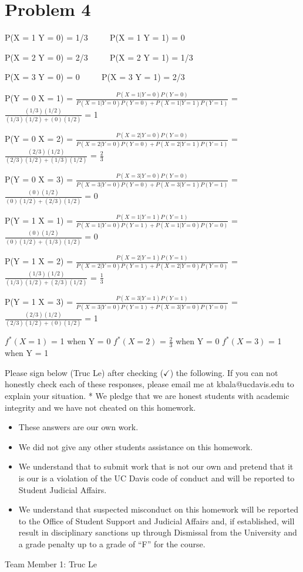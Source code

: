 \documentclass[11pt]{article}
\begin{document}
    \hypertarget{problem-4}{%
\section{Problem 4}\label{problem-4}}

    P(X = 1\textbar{} Y = 0) = 1/3    P(X = 1\textbar{} Y = 1) = 0

P(X = 2\textbar{} Y = 0) = 2/3    P(X = 2\textbar{} Y = 1) = 1/3

P(X = 3\textbar{} Y = 0) = 0    P(X = 3\textbar{} Y = 1) = 2/3

P(Y = 0\textbar{} X = 1) =
\(\frac{P(X = 1|Y = 0)P(Y = 0)}{P(X = 1|Y = 0)P(Y = 0) + P(X = 1|Y = 1)P(Y = 1)}\)
= \(\frac{(1/3)(1/2)}{(1/3)(1/2) + (0)(1/2)}\) = 1

P(Y = 0\textbar{} X = 2) =
\(\frac{P(X = 2|Y = 0)P(Y = 0)}{P(X = 2|Y = 0)P(Y = 0) + P(X = 2|Y = 1)P(Y = 1)}\)
= \(\frac{(2/3)(1/2)}{(2/3)(1/2) + (1/3)(1/2)}\) = \(\frac{2}{3}\)

P(Y = 0\textbar{} X = 3) =
\(\frac{P(X = 3|Y = 0)P(Y = 0)}{P(X = 3|Y = 0)P(Y = 0) + P(X = 3|Y = 1)P(Y = 1)}\)
= \(\frac{(0)(1/2)}{(0)(1/2) + (2/3)(1/2)}\) = 0

P(Y = 1\textbar{} X = 1) =
\(\frac{P(X = 1|Y = 1)P(Y = 1)}{P(X = 1|Y = 0)P(Y = 1) + P(X = 1|Y = 0)P(Y = 0)}\)
= \(\frac{(0)(1/2)}{(0)(1/2) + (1/3)(1/2)}\) = 0

P(Y = 1\textbar{} X = 2) =
\(\frac{P(X = 2|Y = 1)P(Y = 1)}{P(X = 2|Y = 0)P(Y = 1) + P(X = 2|Y = 0)P(Y = 0)}\)
= \(\frac{(1/3)(1/2)}{(1/3)(1/2) + (2/3)(1/2)}\) = \(\frac{1}{3}\)

P(Y = 1\textbar{} X = 3) =
\(\frac{P(X = 3|Y = 1)P(Y = 1)}{P(X = 3|Y = 0)P(Y = 1) + P(X = 3|Y = 0)P(Y = 0)}\)
= \(\frac{(2/3)(1/2)}{(2/3)(1/2) + (0)(1/2)}\) = 1

\(f^{*}(X=1)\) = 1 when Y = 0 \(f^{*}(X=2)\) = \(\frac{2}{3}\) when Y =
0 \(f^{*}(X=3)\) = 1 when Y = 1

    Please sign below (Truc Le) after checking (\(\checkmark\)) the
following. If you can not honestly check each of these responses, please
email me at kbala@ucdavis.edu to explain your situation. * We pledge
that we are honest students with academic integrity and we have not
cheated on this homework.

\begin{itemize}
\item
  These answers are our own work.
\item
  We did not give any other students assistance on this homework.
\item
  We understand that to submit work that is not our own and pretend that
  it is our is a violation of the UC Davis code of conduct and will be
  reported to Student Judicial Affairs.
\item
  We understand that suspected misconduct on this homework will be
  reported to the Office of Student Support and Judicial Affairs and, if
  established, will result in disciplinary sanctions up through
  Dismissal from the University and a grade penalty up to a grade of
  ``F'' for the course.
\end{itemize}

Team Member 1: Truc Le


    
    
    
\end{document}
